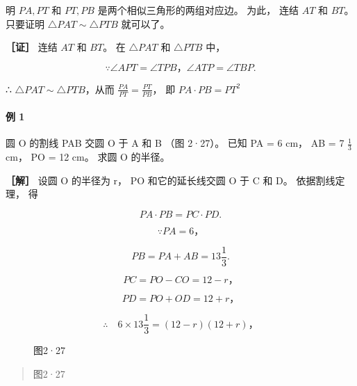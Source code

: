 明 \(PA, PT\) 和 \(PT, PB\) 是两个相似三角形的两组对应边。 为此， 连结
\(AT\) 和 \(BT\)。 只要证明 \(\triangle PAT \sim \triangle PTB\)
就可以了。

\textbf{［证］} 连结 \(AT\) 和 \(BT\)。 在 \(\triangle PAT\) 和
\(\triangle PTB\) 中，

\[
\because \angle A P T = \angle T P B\text{，} \angle A T P = \angle T B P.
\]

∴ \(\triangle PAT \sim \triangle PTB\)，从而
\(\frac{PA}{PT} = \frac{PT}{PB}\)， 即 \(PA\cdot PB = PT^{2}\)

\paragraph{例 1}

圆 O 的割线 PAB 交圆 O 于 A 和 B （图 2·27）。 已知 PA = 6 cm， AB = 7
\(\frac{1}{3}\) cm， PO = 12 cm。 求圆 O 的半径。

\textbf{［解］} 设圆 O 的半径为 r， PO 和它的延长线交圆 O 于 C 和 D。
依据割线定理， 得

\[
P A \cdot P B = P C \cdot P D.
\]

\[
\because P A = 6\text{，}
\]

\[
P B = P A + A B = 13 \frac {1}{3}.
\]

\[
P C = P O - C O = 12 - r\text{，}
\]

\[
P D = P O + O D = 12 + r\text{，}
\]

\[
\therefore \quad 6 \times 13 \frac {1}{3} = (12 - r) (12 + r)\text{，}
\]

\begin{figure}
\centering
{}
\caption{图2·27}
\end{figure}

\begin{quote}
图2·27
\end{quote}

